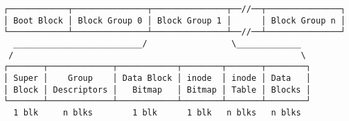 \documentclass[varwidth=46.3em,crop]{standalone}
\begin{document}
\begin{verbatim}
┌────────────┬───────────────┬───────────────┬──//──┬───────────────┐
│ Boot Block │ Block Group 0 │ Block Group 1 │      │ Block Group n │
└────────────┴───────────────┴───────────────┴──//──┴───────────────┘
  __________________________/                 \_____________
 /                                                          \
┌───────┬─────────────┬────────────┬────────┬───────┬────────┐
│ Super │    Group    │ Data Block │ inode  │ inode │ Data   │
│ Block │ Descriptors │   Bitmap   │ Bitmap │ Table │ Blocks │
└───────┴─────────────┴────────────┴────────┴───────┴────────┘
  1 blk     n blks        1 blk      1 blk   n blks   n blks
\end{verbatim}
\end{document}
